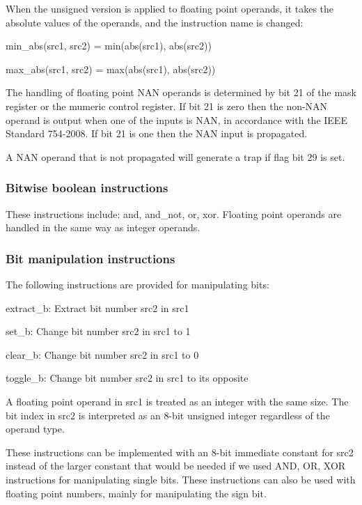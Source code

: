 \documentclass[forwardcom.tex]{subfiles}
\begin{document}
When the unsigned version is applied to floating point operands, it takes the absolute values of the operands, and the instruction name is changed:
\vspace{2mm}

min\_abs(src1, src2) = min(abs(src1), abs(src2))

max\_abs(src1, src2) = max(abs(src1), abs(src2))
\vspace{2mm}

The handling of floating point NAN operands is determined by bit 21 of the mask register or the mumeric control register. If bit 21 is zero then the non-NAN operand is output when one of the inputs is NAN, in accordance with the IEEE Standard 754-2008. If bit 21 is one then the NAN input is propagated.
\vspace{2mm}

A NAN operand that is not propagated will generate a trap if flag bit 29 is set.

\subsubsection{Bitwise boolean instructions}
These instructions include: and, and\_not, or, xor. Floating point operands are handled in the same way as integer operands.

\subsubsection{Bit manipulation instructions}
The following instructions are provided for manipulating bits: 
\vspace{2mm}

extract\_b: Extract bit number src2 in src1

set\_b: Change bit number src2 in src1 to 1

clear\_b: Change bit number src2 in src1 to 0

toggle\_b: Change bit number src2 in src1 to its opposite
\vspace{2mm}

A floating point operand in src1 is treated as an integer with the same size. The bit index in src2 is interpreted as an 8-bit unsigned integer regardless of the operand type.
\vspace{2mm}

These instructions can be implemented with an 8-bit immediate constant for src2 instead of the larger constant that would be needed if we used AND, OR, XOR instructions for manipulating single bits. These instructions can also be used with floating point numbers, mainly for manipulating the sign bit.
\end{document}
